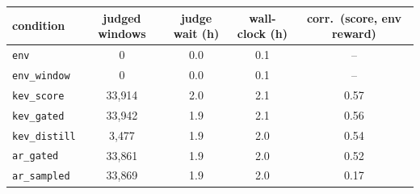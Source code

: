 \begin{tabular}{@{}lcccc@{}}
\toprule
condition & judged windows & judge wait (h) & wall-clock (h) & corr.\ (score, env reward) \\ \midrule
\texttt{env} & 0 & 0.0 & 0.1 & -- \\
\texttt{env\_window} & 0 & 0.0 & 0.1 & -- \\
\texttt{kev\_score} & 33{,}914 & 2.0 & 2.1 & 0.57 \\
\texttt{kev\_gated} & 33{,}942 & 1.9 & 2.1 & 0.56 \\
\texttt{kev\_distill} & 3{,}477 & 1.9 & 2.0 & 0.54 \\
\texttt{ar\_gated} & 33{,}861 & 1.9 & 2.0 & 0.52 \\
\texttt{ar\_sampled} & 33{,}869 & 1.9 & 2.0 & 0.17 \\
\bottomrule
\end{tabular}
